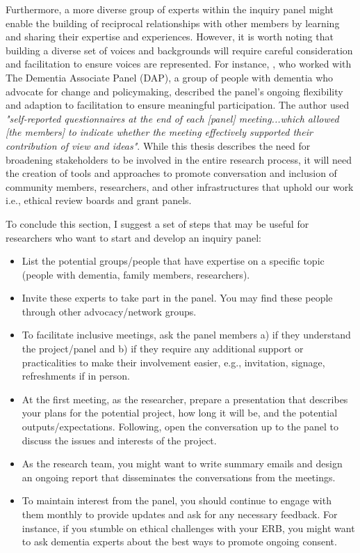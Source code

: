 Furthermore, a more diverse group of experts within the inquiry panel might enable the building of reciprocal relationships with other members by learning and sharing their expertise and experiences. However, it is worth noting that building a diverse set of voices and backgrounds will require careful consideration and facilitation to ensure voices are represented. For instance, \cite{innes2021s}, who worked with The Dementia Associate Panel (DAP), a group of people with dementia who advocate for change and policymaking, described the panel's ongoing flexibility and adaption to facilitation to ensure meaningful participation. The author used \textit{"self-reported questionnaires at the end of each [panel] meeting...which allowed [the members] to indicate whether the meeting effectively supported their contribution of view and ideas"}. While this thesis describes the need for broadening stakeholders to be involved in the entire research process, it will need the creation of tools and approaches to promote conversation and inclusion of community members, researchers, and other infrastructures that uphold our work i.e., ethical review boards and grant panels. 

To conclude this section, I suggest a set of steps that may be useful for researchers who want to start and develop an inquiry panel:

\begin{itemize}
    \item List the potential groups/people that have expertise on a specific topic (people with dementia, family members, researchers).
    \item Invite these experts to take part in the panel. You may find these people through other advocacy/network groups.
    \item To facilitate inclusive meetings, ask the panel members a) if they understand the project/panel and b) if they require any additional support or practicalities to make their involvement easier, e.g., invitation, signage, refreshments if in person.
    \item At the first meeting, as the researcher, prepare a presentation that describes your plans for the potential project, how long it will be, and the potential outputs/expectations. Following, open the conversation up to the panel to discuss the issues and interests of the project.
    \item As the research team, you might want to write summary emails and design an ongoing report that disseminates the conversations from the meetings. 
    \item To maintain interest from the panel, you should continue to engage with them monthly to provide updates and ask for any necessary feedback. For instance, if you stumble on ethical challenges with your ERB, you might want to ask dementia experts about the best ways to promote ongoing consent. 

\end{itemize}

